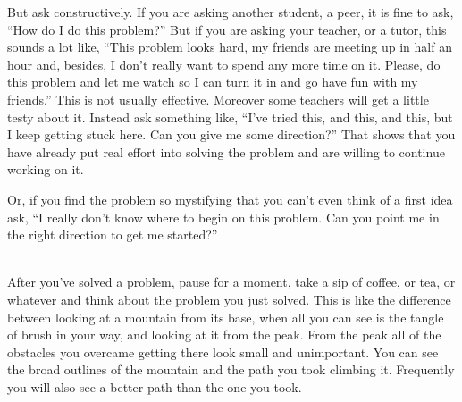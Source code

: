 \begin{description}
  But ask constructively. If you are asking another student, a peer,
  it is fine to ask, ``How do I do this problem?'' But if you are
  asking your teacher, or a tutor, this sounds a lot like, ``This
  problem looks hard, my friends are meeting up in half an hour and,
  besides, I don't really want to spend any more time on it. Please,
  do this problem and let me watch so I can turn it in and go have
  fun with my friends.'' This is not
  usually effective. Moreover some teachers will get a little testy
  about it. Instead ask something like, ``I've tried this, and this,
  and this, but I keep getting stuck here. Can you give me some
  direction?''  That shows that you have already put real effort into
  solving the problem and are willing to continue working on it.

  Or, if you find the problem so mystifying that you can't even
  think of a first idea ask, ``I really don't know where to begin on
  this problem. Can you point me in the right direction to get me
  started?''

  \item[Keep thinking about the problem after you solve it.]\ \\
After you've solved a problem, pause for a moment, take
a sip of coffee, or tea, or whatever and think about
the problem you just solved. This is like the difference between looking
at a mountain from its base, when all you can see is the tangle of
brush in your way, and looking at it from the peak. From the peak all
of the obstacles you overcame getting there look small and
unimportant. You can see the broad outlines of the mountain and the
path you took climbing it. Frequently you will also see a better path
than the one you took.


\end{description}
